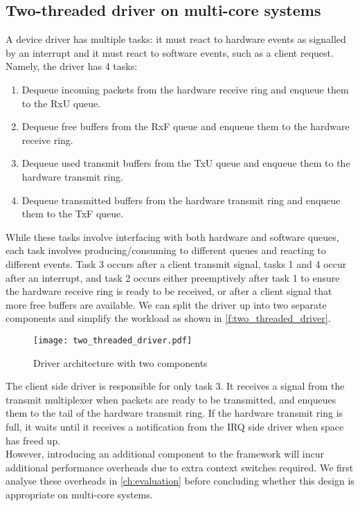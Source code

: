 \subsection{Two-threaded driver on multi-core systems}
A device driver has multiple tasks: it must react to hardware events as signalled by an interrupt and it must react to software events,
such as a client request. Namely, the driver has 4 tasks:

\begin{enumerate}
    \item Dequeue incoming packets from the hardware receive ring and enqueue them to the RxU queue.
    \item Dequeue free buffers from the RxF queue and enqueue them to the hardware receive ring.
    \item Dequeue used transmit buffers from the TxU queue and enqueue them to the hardware transmit ring.
    \item Dequeue transmitted buffers from the hardware transmit ring and enqueue them to the TxF queue. 
\end{enumerate}

While these tasks involve interfacing with both hardware and software queues, each task involves
producing/consuming to different queues and reacting to different events. Task 3 occurs after a client transmit signal, 
tasks 1 and 4 occur after an interrupt, and task 2 occurs either preemptively after task 1 to ensure the hardware receive
ring is ready to be received, or after a client signal that more free buffers are available. We can split the driver up into
two separate components and simplify the workload as shown in \autoref{f:two_threaded_driver}.

\begin{figure}[h]
    \centering
    \texttt{[image: two\_threaded\_driver.pdf]}
    \caption{Driver architecture with two components}
    \label{f:two_threaded_driver}
\end{figure}

The client side driver is responsible for only task 3. It receives a signal from the transmit multiplexer when packets are ready
to be transmitted, and enqueues them to the tail of the hardware transmit ring. If the hardware transmit ring is full, it waits 
until it receives a notification from the IRQ side driver when space has freed up.\\
However, introducing an additional component to the framework will incur additional performance overheads due to extra context switches required.
We first analyse these overheads in \autoref{ch:evaluation} before concluding whether this design is appropriate on multi-core systems. 

